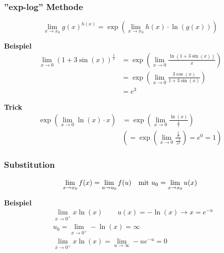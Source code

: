 \documentclass[8pt, a4paper, landscape, fleqn]{scrartcl}
\newenvironment {example}
				{\begin{itshape} \begin{small}}
				{\end{small} \end{itshape}}
\newenvironment {eq}
				{\begin{equation*}}
				{\end{equation*}}
\begin{document}
\begin{multicols*}{3}
				\subsubsection{''exp-log'' Methode}
					\begin{eq}
						\lim_{x \rightarrow x_0} g(x)^{h(x)}=\exp\left(\lim_{x \rightarrow x_0} h(x) \cdot \ln(g(x))\right)
					\end{eq}
					\begin{example}
						\textbf{Beispiel}
						\begin{align*}
							\lim_{x \rightarrow 0}(1+3\sin(x))^{\frac{1}{x}}&=\exp \left(\lim_{x \rightarrow 0} \frac{\ln(1+3\sin(x))}{x}\right)\\
							&=\exp \left(\lim_{x \rightarrow 0} \frac{3 \cos(x)}{1+3\sin(x)}\right)\\
							&=e^3
						\end{align*}
					\end{example}
					\begin{example}
						\textbf{Trick}
						\begin{align*}
        				     \exp(\lim_{x \rightarrow 0}\ln (x) \cdot x) &=\exp(\lim_{x \rightarrow 0} \frac{\ln (x)}{\frac{1}{x}})\\  
        				     &(= \exp(\lim_{x \rightarrow 0} \frac{\frac{1}{x}}{\frac{-1}{x^2}}) = e^0 = 1)
						\end{align*}
					\end{example}
				\subsubsection{Substitution}
					\begin{equation*}
						\lim_{x \rightarrow x_0} f(x)=\lim_{u \rightarrow u_0} f(u) \hspace{10pt} \text{mit } u_0=\lim_{x \rightarrow x_0} u(x)\\
					\end{equation*}
					\begin{example}
						\textbf{Beispiel}
						\begin{align*}
							&\lim_{x \rightarrow 0^+} x\ln(x) \hspace{25pt} u(x)=-\ln(x) \rightarrow x=e^{-u}\\
							&u_0=\lim_{x \rightarrow 0^+} -\ln(x)=\infty\\
							&\lim_{x \rightarrow 0^+} x\ln(x)=\lim_{u \rightarrow \infty} -ue^{-u}=0
						\end{align*}
					\end{example}

\end{multicols*}
\end{document}
